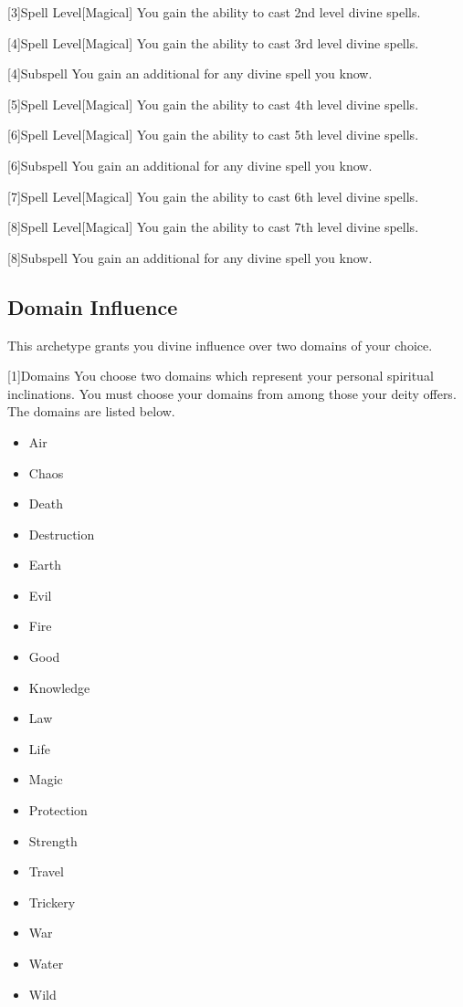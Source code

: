         [3]{Spell Level}[Magical] You gain the ability to cast 2nd level divine spells.

        [4]{Spell Level}[Magical] You gain the ability to cast 3rd level divine spells.

        [4]{Subspell} You gain an additional  for any divine spell you know.

        [5]{Spell Level}[Magical] You gain the ability to cast 4th level divine spells.

        [6]{Spell Level}[Magical] You gain the ability to cast 5th level divine spells.

        [6]{Subspell} You gain an additional  for any divine spell you know.

        [7]{Spell Level}[Magical] You gain the ability to cast 6th level divine spells.

        [8]{Spell Level}[Magical] You gain the ability to cast 7th level divine spells.

        [8]{Subspell} You gain an additional  for any divine spell you know.

    \subsection{Domain Influence}
        This archetype grants you divine influence over two domains of your choice.

        [1]{Domains}
        You choose two domains which represent your personal spiritual inclinations.
        You must choose your domains from among those your deity offers.
        The domains are listed below.

        \begin{itemize}
            \item{Air}
            \item{Chaos}
            \item{Death}
            \item{Destruction}
            \item{Earth}
            \item{Evil}
            \item{Fire}
            \item{Good}
            \item{Knowledge}
            \item{Law}
            \item{Life}
            \item{Magic}
            \item{Protection}
            \item{Strength}
            \item{Travel}
            \item{Trickery}
            \item{War}
            \item{Water}
            \item{Wild}
        \end{itemize}

